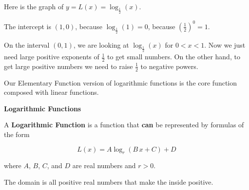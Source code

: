 \documentclass{ximera}
\begin{document}
\begin{example}

Here is the graph of $y = L(x) = \log_{\tfrac{1}{2}}(x)$.

\begin{image}
\end{image}


The intercept is $(1,0)$, because $\log_{\tfrac{1}{2}}(1) = 0$, because $\left(\frac{1}{2}\right)^0 = 1$.

On the interval $(0,1)$, we are looking at $\log_{\tfrac{1}{2}}(x)$ for $0<x<1$.  Now we just need large positive exponents of $\frac{1}{2}$ to get small numbers.  On the other hand, to get large positive numbers we need to raise $\frac{1}{2}$ to negative powers.





\end{example}





Our Elementary Function version of logarithmic functions is the core function composed with linear functions.





\begin{definition} \textbf{\textcolor{green!50!black}{Logarithmic Functions}}

A \textbf{Logarithmic Function} is a function that \textbf{\textcolor{purple!85!blue}{can}} be represented by formulas of the form

\[     L(x) =    A \log_r(B \, x + C) + D            \]

where $A$, $B$, $C$, and $D$ are real numbers and $r > 0$.

The domain is all positive real numbers that make the inside positive.

\end{definition}
\end{document}
